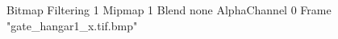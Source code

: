{Bitmap
	{Filtering 1}
	{Mipmap 1}
	{Blend none}
	{AlphaChannel 0}
	{Frame "gate_hangar1_x.tif.bmp"}
}
